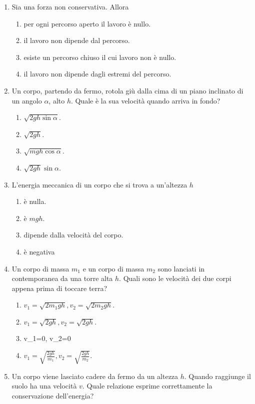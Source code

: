 \documentclass{article}
\begin{document}
\begin{enumerate}
\begin{enumerate}[label=\Alph*.]
  \end{enumerate}
  \item Sia  una forza non conservativa. Allora
  \begin{enumerate}[label=\Alph*.]
    \item per ogni percorso aperto il lavoro è nullo.
    \item il lavoro non dipende dal percorso.
    \item esiste un percorso chiuso il cui lavoro non è nullo.
    \item il lavoro non dipende dagli estremi del percorso.
  \end{enumerate}
  \item Un corpo, partendo da fermo, rotola giù dalla cima di un piano inclinato di un angolo $\alpha$, alto $h$. Quale è la sua velocità quando arriva in fondo?
  \begin{enumerate}[label=\Alph*.]
    \item $\sqrt{2gh\sin\alpha}$.
    \item $\sqrt{2gh}$.
    \item $\sqrt{mgh\cos\alpha}$.
    \item $\sqrt{2gh}\sin\alpha$.
  \end{enumerate}
  \item L'energia meccanica di un corpo che si trova a un'altezza $h$
  \begin{enumerate}[label=\Alph*.]
    \item è nulla.
    \item è $mgh$.
    \item dipende dalla velocità del corpo.
    \item è negativa
  \end{enumerate}
  \item Un corpo di massa $m_1$ e un corpo di massa $m_2$ sono lanciati in contemporanea da una torre alta $h$. Quali sono le velocità dei due corpi appena prima di toccare terra?
  \begin{enumerate}[label=\Alph*.]
    \item $v_1=\sqrt{2m_1gh}, v_2=\sqrt{2m_2gh}$.
    \item $v_1=\sqrt{2gh}, v_2=\sqrt{2gh}$.
    \item v_1=0, v_2=0
    \item $v_1=\sqrt{\frac{2gh}{m_1}}, v_2=\sqrt{\frac{2gh}{m_2}}$.
  \end{enumerate}
  \item Un corpo viene lasciato cadere da fermo da un altezza $h$. Quando raggiunge il suolo ha una velocità $v$. Quale relazione esprime correttamente la conservazione dell'energia?

\end{enumerate}
\end{document}
